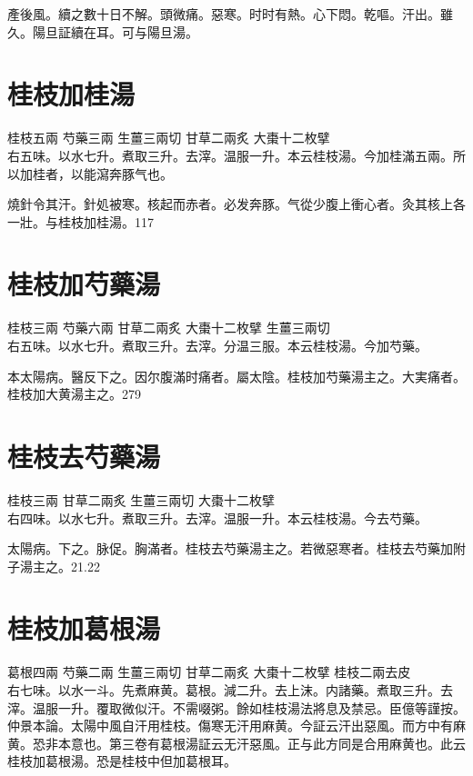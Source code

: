 產後風。續之數十日不解。頭微痛。惡寒。时时有熱。心下悶。乾嘔。汗出。雖久。陽旦証續在耳。可与陽旦湯。{\dengben}

\section{桂枝加桂湯}

桂枝{\scriptsize 五兩} 芍藥{\scriptsize 三兩} 生薑{\scriptsize 三兩切} 甘草{\scriptsize 二兩炙} 大棗{\scriptsize 十二枚擘}\\
右五味。以水七升。煮取三升。去滓。温服一升。本云桂枝湯。今加桂滿五兩。所以加桂者，以能瀉奔豚气也。

燒針令其汗。針処被寒。核起而赤者。必发奔豚。气從少腹上衝心者。灸其核上各一壯。与桂枝加桂湯。117

\section{桂枝加芍藥湯}

桂枝{\scriptsize 三兩} 芍藥{\scriptsize 六兩} 甘草{\scriptsize 二兩炙} 大棗{\scriptsize 十二枚擘} 生薑{\scriptsize 三兩切}\\
右五味。以水七升。煮取三升。去滓。分温三服。本云桂枝湯。今加芍藥。

{\khaaitp 本}太陽病。醫反下之。因尔腹滿时痛者。屬太陰。桂枝加芍藥湯主之。大実痛者。桂枝加大黄湯主之。279

\section{桂枝去芍藥湯}

桂枝{\scriptsize 三兩} 甘草{\scriptsize 二兩炙} 生薑{\scriptsize 三兩切} 大棗{\scriptsize 十二枚擘}\\
右四味。以水七升。煮取三升。去滓。温服一升。本云桂枝湯。今去芍藥。

太陽病。下之。脉促。胸滿者。桂枝去芍藥湯主之。若微{\khaaitp 惡}寒者。桂枝去芍藥加附子湯主之。21.22

\section{桂枝加葛根湯}

葛根{\scriptsize 四兩} 芍藥{\scriptsize 二兩} 生薑{\scriptsize 三兩切} 甘草{\scriptsize 二兩炙} 大棗{\scriptsize 十二枚擘} 桂枝{\scriptsize 二兩去皮}\\
右七味。以水一斗。先煮麻黄。葛根。減二升。去上沫。内諸藥。煮取三升。去滓。温服一升。覆取微似汗。不需啜粥。餘如桂枝湯法將息及禁忌。{\scriptsize 臣億等謹按。仲景本論。太陽中風自汗用桂枝。傷寒无汗用麻黄。今証云汗出惡風。而方中有麻黄。恐非本意也。第三卷有葛根湯証云无汗惡風。正与此方同是合用麻黄也。此云桂枝加葛根湯。恐是桂枝中但加葛根耳。}

